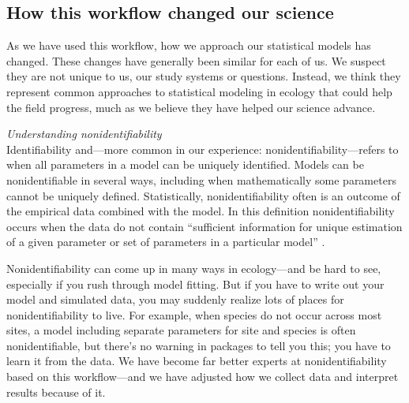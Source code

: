 \documentclass[11pt]{article}
\begin{document}
{\subsection{How this workflow changed our science} %

As we have used this workflow, how we approach our statistical models has changed. These changes have generally been similar for each of us. We suspect they are not unique to us, our study systems or questions. Instead, we think they represent common approaches to statistical modeling in ecology that could help the field progress, much as we believe they have helped our science advance. 

 \emph{Understanding nonidentifiability} \\
Identifiability and---more common in our experience: nonidentifiability---refers to when all parameters in a model can be uniquely identified. Models can be nonidentifiable in several ways, including when mathematically some parameters cannot be uniquely defined. Statistically, nonidentifiability often is an outcome of the empirical data combined with the model. In this definition nonidentifiability occurs when the data do not contain ``sufficient information for unique estimation of a given parameter or set of parameters in a particular model'' \citep{gelmanhill}. 

Nonidentifiability can come up in many ways in ecology---and be hard to see, especially if you rush through model fitting. But if you have to write out your model and simulated data, you may suddenly realize lots of places for nonidentifiability to live. For example, when species do not occur across most sites, a model including separate parameters for site and species is often nonidentifiable, but there's no warning in packages to tell you this; you have to learn it from the data. We have become far better experts at nonidentifiability based on this workflow---and we have adjusted how we collect data and interpret results because of it. %

}
\end{document}
